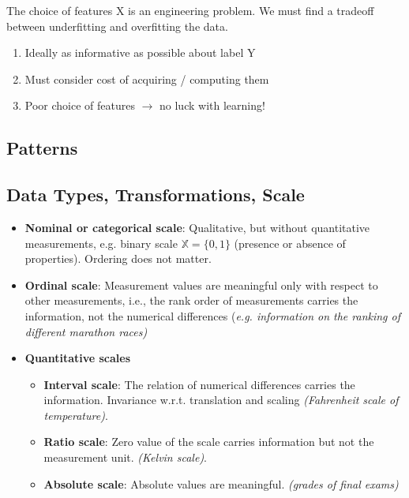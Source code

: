 \documentclass[MachineLearning]{subfiles}
\begin{document}
The choice of features X is an engineering problem. We must find a tradeoff between underfitting and overfitting the data.
\begin{enumerate}
\item Ideally as informative as possible about label Y
\item Must consider cost of acquiring / computing them
\item Poor choice of features \(\rightarrow\) no luck with learning!
\end{enumerate}
\subsection{Patterns}
\subsection{Data Types, Transformations, Scale}
\begin{itemize}
\item \textbf{Nominal or categorical scale}: Qualitative, but without quantitative measurements, e.g. binary scale \(\mathbb{X} = \{0, 1\}\) (presence or absence of
properties). Ordering does not matter.
\item \textbf{Ordinal scale}: Measurement values are meaningful only with respect to other measurements, i.e., the rank order of measurements carries
the information, not the numerical differences {\color{orange}(\emph{e.g. information
on the ranking of different marathon races)}}
\item \textbf{Quantitative scales}
\begin{itemize}
\item \textbf{Interval scale}: The relation of numerical differences carries
the information. Invariance w.r.t. translation and scaling {\color{orange}\emph{(Fahrenheit scale of temperature)}}.
\item \textbf{Ratio scale}: Zero value of the scale carries information but
not the measurement unit. {\color{orange}\emph{(Kelvin scale)}}.
\item \textbf{Absolute scale}: Absolute values are meaningful. {\color{orange}\emph{(grades of final exams)}}
\end{itemize}
\end{itemize}
\end{document}
